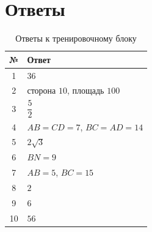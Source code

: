 \documentclass[a4paper,12pt]{article}
\begin{document}
\newpage
\section*{\color{darkaccent}Ответы}
\begin{table}[h!]\centering
\caption{Ответы к тренировочному блоку}
\begin{tabularx}{\linewidth}{@{}cX@{}}
\toprule
\textbf{№} & \textbf{Ответ}\\
\midrule
1 & $36$\\
2 & сторона $10$, площадь $100$\\
3 & $\dfrac52$\\
4 & $AB=CD=7$, $BC=AD=14$\\
5 & $2\sqrt3$\\
6 & $BN=9$\\
7 & $AB=5$, $BC=15$\\
8 & $2$\\
9 & $6$\\
10 & $56$\\
\bottomrule
\end{tabularx}
\end{table}
\end{document}

